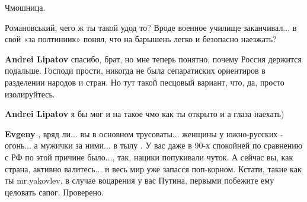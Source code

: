 \begin{itemize}
Чмошница.

\begin{itemize}
 
Романовський, чего ж ты такой удод то? Вроде военное училище заканчивал... в свой «за полтинник» понял, что на барышень легко и безопасно наезжать? \Smiley[1.0][yellow]

 
\textbf{Andrei Lipatov} спасибо, брат, но мне теперь понятно, почему Россия держится подальше. Господи прости, никогда не была сепаратиских ориентиров в разделении народов и стран. Но тут такой песцовый вариант, что, да, просто изолируйтесь.

 
\textbf{Andrei Lipatov} я бы мог и на такое чмо как ты открыто и а глаза наехать)

 
\textbf{Evgeny} , вряд ли... вы в основном трусоваты... женщины у южно-русских -
огонь... а мужички за ними... в тылу \Smiley[1.0][yellow] . У вас даже в 90-х спокойней по сравнению
с РФ по этой причине было..., так, нацики попукивали чуток. А сейчас вы, как
страна, активно валитесь... и весь мир уже запасся поп-корном. Кстати, такие как
ты mr.yakovlev, в случае воцарения у вас Путина, первыми побежите ему целовать
сапог. Проверено.

 


\end{itemize}
\end{itemize}
